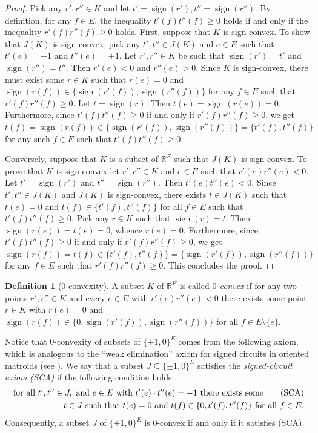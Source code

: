 \documentclass[11pt,a4paper]{amsart}
\theoremstyle{definition}
\newtheorem{definition}{Definition}
\numberwithin{equation}{section}
\DeclareMathOperator{\sign}{sign}
\newcommand{\hcovectors}{J}
\begin{document}
\begin{proof} Pick any $r',r''\in K$ and let $t'=\sign(r'), t''=\sign(r'')$. By definition, for any $f\in E$, the inequality $t'(f)t''(f)\ge 0$ holds if and only if the inequality $r'(f)r''(f)\ge 0$ holds. First, suppose that $K$ is sign-convex. To show that $J(K)$ is sign-convex,  pick any $t',t''\in J(K)$ and $e\in E$ such that  $t'(e)=-1$ and $t''(e)=+1$.  Let $r',r''\in K$ be such that $\sign(r')=t'$ and $\sign(r'')=t''$. Then $r'(e)<0$ and $r''(e)>0$. Since $K$ is sign-convex, there must exist some $r\in K$ such that
$r(e)=0$ and $\sign(r(f))\in \{ \sign(r'(f)),\sign(r''(f))\}$ for any $f\in E$ such that $r'(f)r''(f)\ge 0$.
Let $t=\sign(r)$. Then $t(e)=\sign(r(e))=0$.  Furthermore, since $t'(f)t''(f)\ge 0$ if and only if $r'(f)r''(f)\ge 0$, we get $t(f)=\sign(r(f))\in \{ \sign(r'(f)),\sign(r''(f))\}=\{ t'(f),t''(f)\}$
for any such $f\in E$ such that $t'(f)t''(f)\ge 0$.

Conversely, suppose that $K$ is a subset of ${\mathbb R}^E$ such that $J(K)$ is sign-convex. To prove that $K$ is sign-convex let $r',r''\in K$ and $e\in E$ such that $r'(e)r''(e)<0$. Let $t'=\sign(r')$ and $t''=\sign(r'')$. Then $t'(e)t''(e)<0$. Since $t',t''\in J(K)$ and $J(K)$ is sign-convex,
there exists $t\in J(K)$ such that$t(e)=0$ and $t(f)\in \{ t'(f),t''(f)\}$ for all $f\in E$ such that $t'(f)t''(f)\ge 0$. Pick any $r\in K$ such that $\sign(r)=t$. Then $\sign(r(e))=t(e)=0$, whence $r(e)=0$. Furthermore,  since $t'(f)t''(f)\ge 0$ if and only if $r'(f)r''(f)\ge 0$, we get  $\sign(r(f))=t(f)\in \{ t'(f),t''(f)\}=\{\sign(r'(f)),\sign(r''(f))\}$ for any $f\in E$ such that $r'(f)r''(f)\ge 0$. This concludes the proof.
\end{proof}


\begin{definition} [$0$-convexity]
A subset $K$ of ${\mathbb R}^E$ is called \emph{$0$-convex} if for any two points $r',r''\in K$ and every $e\in E$ with $r'(e)r''(e)<0$ there exists some point $r\in K$ with $r(e)=0$ and $\sign(r(f))\in \{ 0, \sign(r'(f)),\sign(r''(f))\}$ for all $f\in E\setminus \{ e\}$.
\end{definition}

Notice that 0-convexity of subsets of  $\{ \pm 1, 0\}^E$  comes from the following axiom, which is analogous to the ``weak elimination'' axiom for signed circuits in oriented matroids (see \cite[Definition 3.2.1]{BjLVStWhZi}). We say that a subset ${\hcovectors}\subseteq \{ \pm 1, 0\}^E$ satisfies the {\it signed-circuit axiom (SCA)} if the following condition holds:
\begin{align*}
\mbox{ for all } t',t''\in {\hcovectors}, \mbox{ and }  e\in E  \mbox{ with  }
t'(e)\cdot t''(e)=-1 \mbox{ there exists  some}\tag{\mbox{SCA}}\\
t\in {\hcovectors} \mbox{ such that } t(e)=0 \mbox{ and }
t(f)\in \{ 0,t'(f),t''(f)\}  \mbox{ for all } f\in E.
\end{align*}
Consequently,  a subset $\hcovectors$ of $\{\pm 1, 0\}^E$ is  $0$-convex if and only if it satisfies (SCA).
\end{document}
